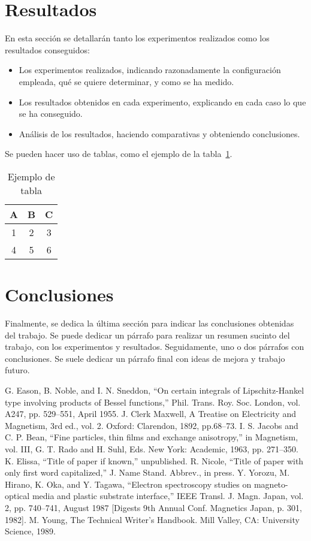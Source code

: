 \documentclass[conference,a4paper]{IEEEtran}
\begin{document}
\section{Resultados}

En esta sección se detallarán tanto los experimentos realizados como los
resultados conseguidos:
\begin{itemize}
\item Los experimentos realizados, indicando razonadamente la configuración
  empleada, qué se quiere determinar, y como se ha medido.
\item Los resultados obtenidos en cada experimento, explicando en cada caso lo
  que se ha conseguido.
\item Análisis de los resultados, haciendo comparativas y obteniendo
  conclusiones.
\end{itemize}

Se pueden hacer uso de tablas, como el ejemplo de la tabla~\ref{tab:ejemplo}.

\begin{table}
  \caption{Ejemplo de tabla}
  \label{tab:ejemplo}
  \centering
  \begin{tabular}{ccc}
    \toprule
    A & B & C \\
    \midrule
    1 & 2 & 3 \\
    4 & 5 & 6 \\
    \bottomrule
  \end{tabular}
\end{table}


\section{Conclusiones}

Finalmente, se dedica la última sección para indicar las conclusiones obtenidas
del trabajo. Se puede dedicar un párrafo para realizar un resumen sucinto del
trabajo, con los experimentos y resultados. Seguidamente, uno o dos párrafos
con conclusiones. Se suele dedicar un párrafo final con ideas de mejora y
trabajo futuro.


\begin{thebibliography}{00}
 G. Eason, B. Noble, and I. N. Sneddon, ``On certain integrals of Lipschitz-Hankel type involving products of Bessel functions,'' Phil. Trans. Roy. Soc. London, vol. A247, pp. 529--551, April 1955.
 J. Clerk Maxwell, A Treatise on Electricity and Magnetism, 3rd ed., vol. 2. Oxford: Clarendon, 1892, pp.68--73.
 I. S. Jacobs and C. P. Bean, ``Fine particles, thin films and exchange anisotropy,'' in Magnetism, vol. III, G. T. Rado and H. Suhl, Eds. New York: Academic, 1963, pp. 271--350.
 K. Elissa, ``Title of paper if known,'' unpublished.
 R. Nicole, ``Title of paper with only first word capitalized,'' J. Name Stand. Abbrev., in press.
 Y. Yorozu, M. Hirano, K. Oka, and Y. Tagawa, ``Electron spectroscopy studies on magneto-optical media and plastic substrate interface,'' IEEE Transl. J. Magn. Japan, vol. 2, pp. 740--741, August 1987 [Digests 9th Annual Conf. Magnetics Japan, p. 301, 1982].
 M. Young, The Technical Writer's Handbook. Mill Valley, CA: University Science, 1989.
\end{thebibliography}
\end{document}
